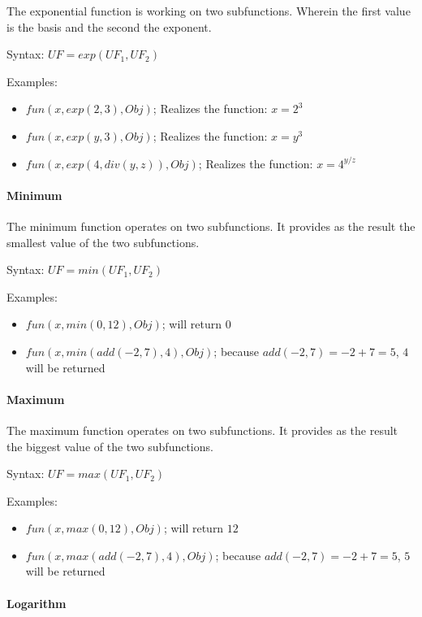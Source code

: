 The exponential function is working on two subfunctions. Wherein the first value is the basis and the second the exponent.


\bigskip\noindent
Syntax:
$UF=exp( UF_1, UF_2 )$

\bigskip\noindent
Examples:
\begin{itemize}
 \item $fun(x, exp( 2, 3), Obj)$; Realizes the function: $x=2^3$
 \item $fun(x, exp( y, 3), Obj)$; Realizes the function: $x=y^3$
 \item $fun(x, exp( 4, div(y,z) ), Obj)$; Realizes the function: $x=4^{y/z}$
\end{itemize}


\paragraph{Minimum}

The minimum function operates on two subfunctions. It provides as the result the smallest value of the two subfunctions.

\bigskip\noindent
Syntax:
$UF=min( UF_1, UF_2 )$

\bigskip\noindent
Examples:
\begin{itemize}
 \item $fun(x, min( 0, 12 ), Obj)$; will return $0$
 \item $fun(x, min( add( -2, 7 ), 4 ), Obj)$; because $add( -2, 7 )= -2+7 = 5$, $4$ will be returned
\end{itemize}


\paragraph{Maximum}

The maximum function operates on two subfunctions. It provides as the result the biggest value of the two subfunctions.

\bigskip\noindent
Syntax:
$UF=max( UF_1, UF_2 )$

\bigskip\noindent
Examples:
\begin{itemize}
 \item $fun(x, max( 0, 12 ), Obj)$; will return $12$
 \item $fun(x, max( add( -2, 7 ), 4 ), Obj)$; because $add( -2, 7 )= -2+7 = 5$, $5$ will be returned
\end{itemize}


\paragraph{Logarithm}

